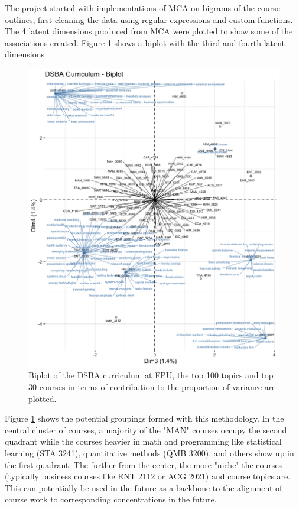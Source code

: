 The project started with implementations of MCA on bigrams of the course outlines,  first cleaning the data using regular expressions 
\cite{regex} and custom functions.  The 4 latent dimensions produced from MCA were plotted to show some of the associations created.  Figure \ref{fig:mca_2} 
shows a biplot with the third and fourth latent dimensions


\begin{figure}[H]
\centering

\includegraphics[width = 1\textwidth, height = .9\textheight]{Content/images/mca_bp_2.png}
\caption{Biplot of the DSBA curriculum at FPU,  the top 100 topics and top 30 courses in terms of contribution to the proportion of variance are plotted.}
\label{fig:mca_2}
\end{figure}

Figure \ref{fig:mca_2} shows the potential groupings formed with this methodology.  In the central cluster of courses, a majority of the "MAN" courses occupy 
the second quadrant while the courses heavier in math and programming like statistical learning (STA 3241),  quantitative methods (QMB 3200), and others show 
up in the first quadrant.  The further from the center, the more "niche" the courses (typically business courses like ENT 2112 or ACG 2021) and course topics are.  
This can potentially be used in the future as a backbone to the alignment of course work to corresponding concentrations in the future.

